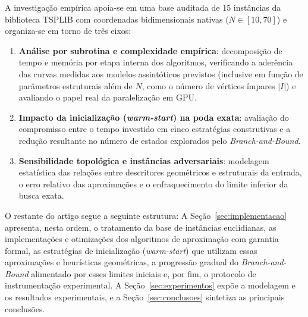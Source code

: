A investigação empírica apoia-se em uma base auditada de 15 instâncias da biblioteca TSPLIB com
coordenadas bidimensionais nativas ($N \in [10, 70]$) e organiza-se em torno de três eixos:
\begin{enumerate}
  \item \textbf{Análise por subrotina e complexidade empírica}: decomposição de tempo e memória
  por etapa interna dos algoritmos, verificando a aderência das curvas medidas aos modelos
  assintóticos previstos (inclusive em função de parâmetros estruturais além de $N$, como o
  número de vértices ímpares $|I|$) e avaliando o papel real da paralelização em GPU.
  \item \textbf{Impacto da inicialização (\textit{warm-start}) na poda exata}: avaliação do
  compromisso entre o tempo investido em cinco estratégias construtivas e a redução resultante
  no número de estados explorados pelo \textit{Branch-and-Bound}.
  \item \textbf{Sensibilidade topológica e instâncias adversariais}: modelagem estatística das
  relações entre descritores geométricos e estruturais da entrada, o erro relativo das
  aproximações e o enfraquecimento do limite inferior da busca exata.
\end{enumerate}

O restante do artigo segue a seguinte estrutura: A Seção~\ref{sec:implementacao} apresenta, nesta
ordem, o tratamento da base de instâncias euclidianas, as implementações e otimizações dos
algoritmos de aproximação com garantia formal, as estratégias de inicialização
(\textit{warm-start}) que utilizam essas aproximações e heurísticas geométricas, a progressão
gradual do \textit{Branch-and-Bound} alimentado por esses limites iniciais e, por fim, o
protocolo de instrumentação experimental. A Seção~\ref{sec:experimentos} expõe a modelagem e
os resultados experimentais, e a Seção~\ref{sec:conclusoes} sintetiza as principais conclusões.
